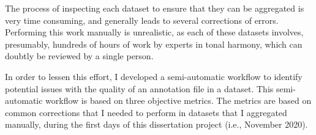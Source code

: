 
The process of inspecting each dataset to ensure that they
can be aggregated is very time consuming, and generally
leads to several corrections of errors. Performing this work
manually is unrealistic, as each of these datasets involves,
presumably, hundreds of hours of work by experts in tonal
harmony, which can doubtly be reviewed by a single person.

In order to lessen this effort, I developed a semi-automatic
workflow to identify potential issues with the quality of an
annotation file in a dataset. This semi-automatic workflow
is based on three objective metrics. The metrics are based
on common corrections that I needed to perform in datasets
that I aggregated manually, during the first days of this
dissertation project (i.e., November 2020).
